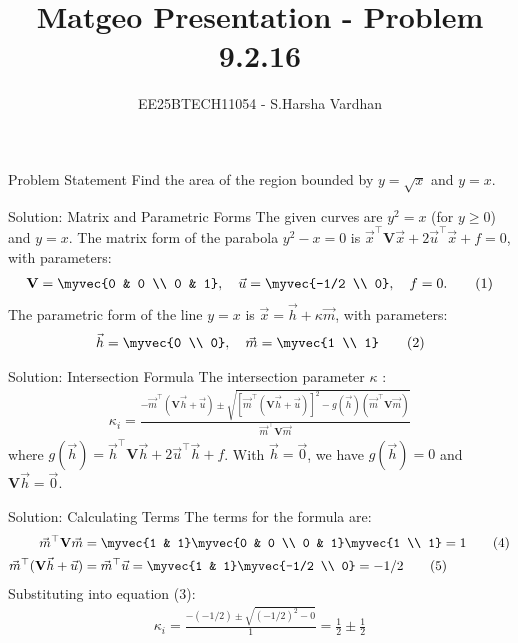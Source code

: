 \documentclass{beamer}
\title{Matgeo Presentation - Problem 9.2.16}
\author{EE25BTECH11054 - S.Harsha Vardhan}
\numberwithin{equation}{section}
\theoremstyle{remark}
\providecommand{\mtx}[1]{\mathbf{#1}}
\begin{document}
\begin{frame}
  \titlepage
\end{frame}

\begin{frame}{Problem Statement}
Find the area of the region bounded by $y = \sqrt{x}$ and $y = x$.
\end{frame}

\begin{frame}{Solution: Matrix and Parametric Forms}
The given curves are $y^2 = x$ (for $y \ge 0$) and $y = x$.
The matrix form of the parabola $y^2 - x = 0$ is $\vec{x}^\top\mtx{V}\vec{x} + 2\vec{u}^\top\vec{x} + f = 0$, with parameters:
\begin{align}
\mtx{V} = \myvec{0 & 0 \\ 0 & 1}, \quad \vec{u} = \myvec{-1/2 \\ 0}, \quad f = 0. \tag{1}
\end{align}
The parametric form of the line $y=x$ is $\vec{x} = \vec{h} + \kappa\vec{m}$, with parameters:
\begin{align}
\vec{h} = \myvec{0 \\ 0}, \quad \vec{m} = \myvec{1 \\ 1} \tag{2}
\end{align}
\end{frame}

\begin{frame}{Solution: Intersection Formula}
The intersection parameter $\kappa$ :
\begin{align}
\kappa_i = \frac{-\vec{m}^\top(\mtx{V}\vec{h} + \vec{u}) \pm \sqrt{[\vec{m}^\top(\mtx{V}\vec{h} + \vec{u})]^2 - g(\vec{h})(\vec{m}^\top\mtx{V}\vec{m})}}{\vec{m}^\top\mtx{V}\vec{m}} \tag{3}
\end{align}
where $g(\vec{h}) = \vec{h}^\top\mtx{V}\vec{h} + 2\vec{u}^\top\vec{h} + f$.
With $\vec{h} = \vec{0}$, we have $g(\vec{h}) = 0$ and $\mtx{V}\vec{h} = \vec{0}$.
\end{frame}

\begin{frame}{Solution: Calculating Terms}
The terms for the formula are:
\begin{align}
\vec{m}^\top\mtx{V}\vec{m} &= \myvec{1 & 1} \myvec{0 & 0 \\ 0 & 1} \myvec{1 \\ 1} = 1 \tag{4} \\
\vec{m}^\top(\mtx{V}\vec{h} + \vec{u}) &= \vec{m}^\top\vec{u} = \myvec{1 & 1} \myvec{-1/2 \\ 0} = -1/2 \tag{5}
\end{align}
Substituting into equation (3):
\begin{align}
\kappa_i = \frac{-(-1/2) \pm \sqrt{(-1/2)^2 - 0}}{1} = \frac{1}{2} \pm \frac{1}{2} \tag{6}
\end{align}
\end{frame}
\end{document}
